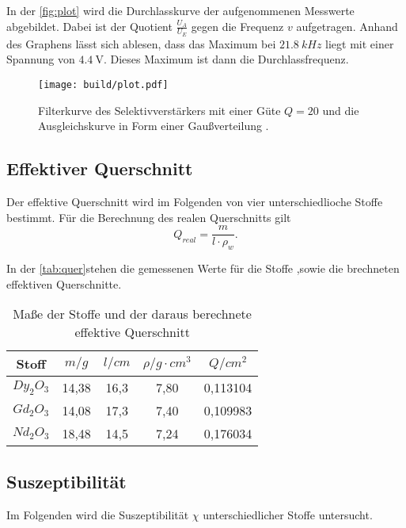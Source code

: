 In der \eqref{fig:plot} wird die Durchlasskurve der aufgenommenen Messwerte abgebildet.
Dabei ist der Quotient $\frac{U_A}{U_E}$ gegen die Frequenz $v$ aufgetragen. Anhand des Graphens lässt sich ablesen, dass das 
Maximum bei $\SI{21.8}{kHz}$ liegt mit einer Spannung von $\SI{4.4}{\volt}$. Dieses Maximum ist dann die Durchlassfrequenz.

\begin{figure}[H]
\texttt{[image: build/plot.pdf]}
	\caption{Filterkurve des Selektivverstärkers mit einer Güte $Q = 20$ und die Ausgleichskurve in Form einer Gaußverteilung .}
	\label{fig:plot}
\end{figure}

\subsection{Effektiver Querschnitt}
\label{sec:Effektiver Querschnitt}

Der effektive Querschnitt wird im Folgenden von vier unterschiedlioche Stoffe bestimmt.
Für die Berechnung des realen Querschnitts gilt 
\begin{equation}
  Q_{real}=\frac{m}{l \cdot \rho_w}.
\end{equation}

In der \eqref{tab:quer}stehen die gemessenen Werte für die Stoffe ,sowie die brechneten effektiven Querschnitte.

\begin{table}
  \centering
  \caption{Maße der Stoffe und der daraus berechnete effektive Querschnitt}
  \label{tab:quer}
\begin{tabular}{c c c c c}
  \toprule
  Stoff &  $m / \si{g}$ &  $l / \si{cm}$ &  $\rho / \si{g} \cdot \si{cm}^3$ & $Q / \si{cm}^2$ \\
  \midrule
  $Dy_2O_3$ & 14,38 &  16,3 &           7,80 & 0,113104 \\
  $Gd_2O_3$ & 14,08 &  17,3 &           7,40 & 0,109983 \\
  $Nd_2O_3$ & 18,48 &  14,5 &           7,24 & 0,176034 \\
  \bottomrule
  \end{tabular}
\end{table}


\subsection{Suszeptibilität}
Im Folgenden wird die Suszeptibilität $\chi$ unterschiedlicher Stoffe untersucht.

